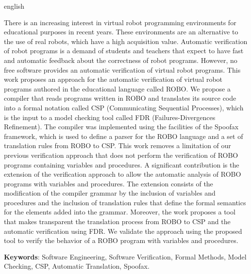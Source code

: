 \begin{resumo}[Abstract]
 \begin{otherlanguage*}{english}
  
There is an increasing interest in virtual robot programming environments for educational purposes in recent years. These environments are an alternative to the use of real robots, which have a high acquisition value. Automatic verification of robot programs is a demand of students and teachers that expect to have fast and automatic feedback about the correctness of robot programs. However, no free software provides an automatic verification of virtual robot programs.  This work proposes an approach for the automatic verification of virtual robot programs authored in the educational language called ROBO. We propose a compiler that reads programs written in ROBO and translates its source code into a formal notation called CSP (Communicating Sequential Processes), which is the input to a model checking tool called FDR (Failures-Divergences Refinement). The compiler was implemented using the facilities of the Spoofax framework, which is used to define a parser for the ROBO language and a set of translation rules from ROBO to CSP.
This work removes a limitation of our previous verification approach that does not perform the verification of ROBO programs containing variables and procedures.
A significant contribution is the extension of the verification approach to allow the automatic analysis of ROBO programs with variables and procedures.
The extension consists of the modification of the compiler grammar by the inclusion of variables and procedures and the inclusion of translation rules that define the formal semantics for the elements added into the grammar.
Moreover, the work proposes a tool that makes transparent the translation process from ROBO to CSP and the automatic verification using FDR. We validate the approach using the proposed tool to verify the behavior of a ROBO program with variables and procedures.

   \vspace{\onelineskip}
 
   \noindent 
   \textbf{Keywords}:  Software Engineering, Software Verification, Formal Methods, Model Checking, CSP, Automatic Translation, Spoofax.
 \end{otherlanguage*}
\end{resumo}
